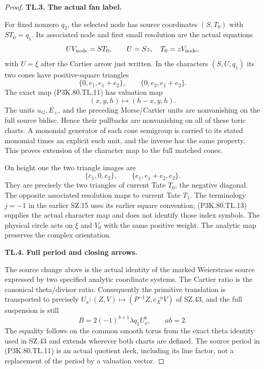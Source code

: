 \begin{proof}
\par\medskip\noindent\textbf{TL.3. The actual fan label.}\par\nopagebreak[4]

For fixed nonzero \(q_2\), the selected node has source coordinates
\((S,T_0)\) with \(ST_0=q_1\). Its associated node and first
small resolution are the actual equations
\[
 U V_{\rm node}=S T_0,\qquad U=S z,\quad T_0=zV_{\rm node},
\]
with \(U=\xi\) after the Cartier arrow just written. In the
characters \((S,U,q_1)\) its two cones have positive-square
triangles
\[
 \{0,e_1,e_1+e_2\},\qquad\{0,e_2,e_1+e_2\}.
\]
The exact map (P3K.80.TL.11) has valuation map
\[
         (x,y,h)\longmapsto(h-x,y,h).                 \tag{P3K.80.TL.13}
\]
The units \(u_G,E_+\), and the preceding Morse/Cartier units
are nonvanishing on the full source bidisc. Hence their pullbacks
are nonvanishing on all of these toric charts. A monomial generator
of each cone semigroup is carried to its stated monomial times an
explicit such unit, and the inverse has the same property. This
proves extension of the character map to the full matched cones.

On height one the two triangle images are
\[
 \{e_1,0,e_2\},\qquad\{e_1,e_1+e_2,e_2\}.
\]
They are precisely the two triangles of current Tate \(T_0\),
the negative diagonal. The opposite associated resolution maps
to current Tate \(T_1\). The terminology \(j=-1\) in the
earlier SZ.15 uses its earlier square convention; (P3K.80.TL.13) supplies
the actual character map and does not identify those index symbols.
The physical circle acts on \(\xi\) and \(V_0\) with the same
positive weight. The analytic map preserves the complex orientation.

\par\medskip\noindent\textbf{TL.4. Full period and closing arrows.}\par\nopagebreak[4]

The source change above is the actual identity of the marked
Weierstrass source expressed by two specified analytic coordinate
systems. The Cartier ratio is the canonical theta/divisor ratio.
Consequently the primitive translation is transported to precisely
\(U_a:(Z,V)\mapsto(P^{-1}Z,c_X^{-a}V)\) of SZ.43, and the
full suspension is still
\[
 B=2(-1)^{b+1}\lambda q_1 U_a^b,\qquad ab=2.
\]
The equality follows on the common smooth torus from the exact
theta identity used in SZ.43 and extends wherever both charts are
defined. The source period in (P3K.80.TL.11) is an actual quotient deck,
including its line factor, not a replacement of the period by a
valuation vector.


\end{proof}

